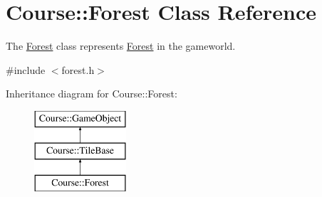 \hypertarget{classCourse_1_1Forest}{\section{Course\-:\-:Forest Class Reference}
\label{classCourse_1_1Forest}
}


The \hyperlink{classCourse_1_1Forest}{Forest} class represents \hyperlink{classCourse_1_1Forest}{Forest} in the gameworld.  




{\ttfamily \#include $<$forest.\-h$>$}

Inheritance diagram for Course\-:\-:Forest\-:\begin{figure}[H]
\begin{center}
\leavevmode
\includegraphics[height=3.000000cm]{classCourse_1_1Forest}
\end{center}
\end{figure}
